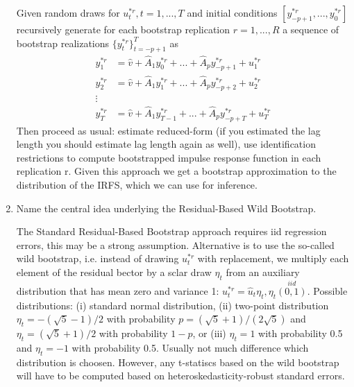 \begin{enumerate}
\begin{solution}
              Given random draws for $u_t^{\ast r}, t=1,...,T$ and initial conditions $[y_{-p+1}^{\ast r}, ... ,y_0^{\ast r}]$ recursively generate for each bootstrap replication $r=1,...,R$ a sequence of bootstrap realizations $\{y_t^{\ast r}\}_{t=-p+1}^T$ as
              \begin{align*}
                  y_1^{\ast r} & = \hat{v} + \hat{A}_1 y_0^{\ast r} + ... + \hat{A}_p y_{-p+1}^{\ast r} + u_1^{\ast r}     \\
                  y_2^{\ast r} & = \hat{v} + \hat{A}_1 y_1^{\ast r} + ... + \hat{A}_p y_{-p+2}^{\ast r} + u_2^{\ast r}     \\
                  \vdots       &                                                                                           \\
                  y_T^{\ast r} & = \hat{v} + \hat{A}_1 y_{T-1}^{\ast r} + ... + \hat{A}_p y_{-p+T}^{\ast r} + u_T^{\ast r}
              \end{align*}
              Then proceed as usual: estimate reduced-form (if you estimated the lag length you should estimate lag length again as well), use identification restrictions to compute bootstrapped impulse response function in each replication r. Given this approach we get a bootstrap approximation to the distribution of the IRFS, which we can use for inference.
          \end{solution}
    \item Name the central idea underlying the Residual-Based Wild Bootstrap.
          \begin{solution}
              The Standard Residual-Based Bootstrap approach requires iid regression errors, this may be a strong assumption. Alternative is to use the so-called wild bootstrap, i.e. instead of drawing $u_t^{\ast r}$ with replacement, we multiply each element of the residual bector by a sclar draw $\eta_t$ from an auxiliary distribution that has mean zero and variance 1: $u_t^{\ast r} = \hat{u}_t \eta_t, \eta_t \overset{iid}{(0,1)}$. Possible distributions: (i) standard normal distribution, (ii) two-point distribution $\eta_t = -(\sqrt{5}-1)/2$ with probability $p=(\sqrt{5}+1)/(2 \sqrt{5})$ and  $\eta_t = (\sqrt{5}+1)/2$ with probability $1-p$, or (iii) $\eta_t =1$ with probability 0.5 and $\eta_t=-1$ with probability 0.5. Usually not much difference which distribution is choosen. However, any t-statiscs based on the wild bootstrap will have to be computed based on heteroskedasticity-robust standard errors.
          \end{solution}

\end{enumerate}
